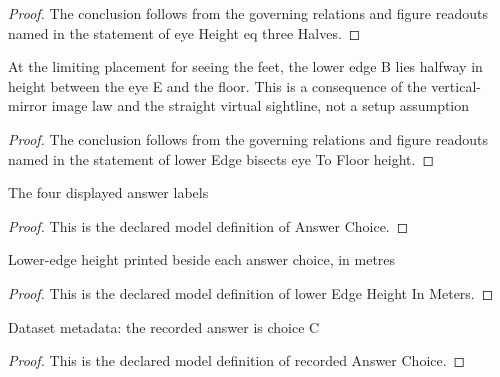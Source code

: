 \begin{proof}
  The conclusion follows from the governing relations and figure readouts named in the statement of eye Height eq three Halves.
\end{proof}
\begin{lemma}
  \label{lem:physics:phyx-mini-0141:phyxminiproblems-problemphyxmini0141-loweredge-bisects-eyetofloor-height}
  At the limiting placement for seeing the feet, the lower edge B lies halfway in height between the eye E and the floor. This is a consequence of the vertical-mirror image law and the straight virtual sightline, not a setup assumption
\end{lemma}
\begin{proof}
  The conclusion follows from the governing relations and figure readouts named in the statement of lower Edge bisects eye To Floor height.
\end{proof}
\begin{definition}
  \label{def:physics:phyx-mini-0141:phyxminiproblems-problemphyxmini0141-answerchoice}
  The four displayed answer labels
\end{definition}
\begin{proof}
  This is the declared model definition of Answer Choice.
\end{proof}
\begin{definition}
  \label{def:physics:phyx-mini-0141:phyxminiproblems-problemphyxmini0141-answerchoice-loweredgeheightinmeters}
  Lower-edge height printed beside each answer choice, in metres
\end{definition}
\begin{proof}
  This is the declared model definition of lower Edge Height In Meters.
\end{proof}
\begin{definition}
  \label{def:physics:phyx-mini-0141:phyxminiproblems-problemphyxmini0141-recordedanswerchoice}
  Dataset metadata: the recorded answer is choice C
\end{definition}
\begin{proof}
  This is the declared model definition of recorded Answer Choice.
\end{proof}
